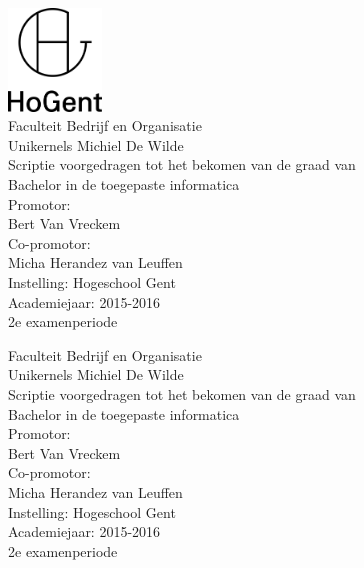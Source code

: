\documentclass[pdftex,a4paper,12pt,twoside]{report}
\newcommand{\emptypage}{
\newpage
\thispagestyle{empty}
\mbox{}
\newpage
}
\newcommand{\student}{Michiel De Wilde}
\newcommand{\promotor}{Bert Van Vreckem}
\newcommand{\copromotor}{Micha Herandez van Leuffen}
\newcommand{\instelling}{Hogeschool Gent}
\newcommand{\titel}{Unikernels}
\newcommand{\faculteit}{Faculteit Bedrijf en Organisatie}
\newcommand{\rapporttype}{Scriptie voorgedragen tot het bekomen van de graad van\\Bachelor in de toegepaste informatica}
\newcommand{\academiejaar}{2015-2016}
\newcommand{\examenperiode}{2e examenperiode}
\begin{document}

\begin{titlepage}
  \begin{center}

    \begingroup
    \rmfamily
    \includegraphics[width=2.5cm]{img/HG-beeldmerk-woordmerk}\\[.5cm]
    \faculteit\\[3cm]
    \titel
    \vfill
    \student\\[3.5cm]
    \rapporttype\\[2cm]
    Promotor:\\
    \promotor\\
    Co-promotor:\\
    \copromotor\\[2.5cm]
    Instelling: \instelling\\[.5cm]
    Academiejaar: \academiejaar\\[.5cm]
    \examenperiode
    \endgroup

  \end{center}
  \restoregeometry
\end{titlepage}


\emptypage


\begin{titlepage}
  \begin{center}

    \begingroup
    \rmfamily
    \faculteit\\[3cm]
    \titel
    \vfill
    \student\\[3.5cm]
    \rapporttype\\[2cm]
    Promotor:\\
    \promotor\\
    Co-promotor:\\
    \copromotor\\[2.5cm]
    Instelling: \instelling\\[.5cm]
    Academiejaar: \academiejaar\\[.5cm]
    \examenperiode
    \endgroup

  \end{center}
  \restoregeometry
\end{titlepage}
\end{document}
